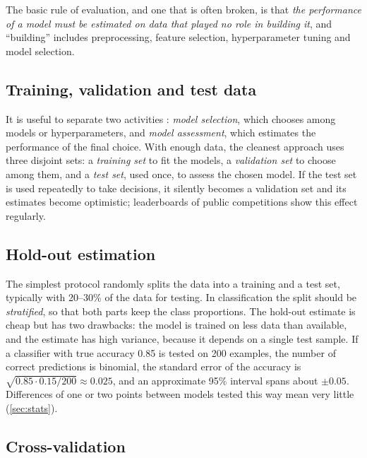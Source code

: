 The basic rule of evaluation, and one that is often broken, is that \emph{the performance of
a model must be estimated on data that played no role in building it}, and ``building''
includes preprocessing, feature selection, hyperparameter tuning and model selection.

\subsection{Training, validation and test data}

It is useful to separate two activities \citep[Chapter~7]{hastie2009elements}:
\emph{model selection}, which chooses among models or hyperparameters, and
\emph{model assessment}, which estimates the performance of the final choice. With enough
data, the cleanest approach uses three disjoint sets: a \emph{training set} to fit the
models, a \emph{validation set} to choose among them, and a \emph{test set}, used once, to
assess the chosen model. If the test set is used repeatedly to take decisions, it silently
becomes a validation set and its estimates become optimistic; leaderboards of public
competitions show this effect regularly.

\subsection{Hold-out estimation}

The simplest protocol randomly splits the data into a training and a test set, typically
with 20--30\% of the data for testing. In classification the split should be
\emph{stratified}, so that both parts keep the class proportions. The hold-out estimate is
cheap but has two drawbacks: the model is trained on less data than available, and the
estimate has high variance, because it depends on a single test sample. If a classifier with
true accuracy 0.85 is tested on 200 examples, the number of correct predictions is binomial,
the standard error of the accuracy is $\sqrt{0.85\cdot0.15/200}\approx0.025$, and an
approximate 95\% interval spans about $\pm0.05$. Differences of one or two points between
models tested this way mean very little (\cref{sec:stats}).

\subsection{Cross-validation}

